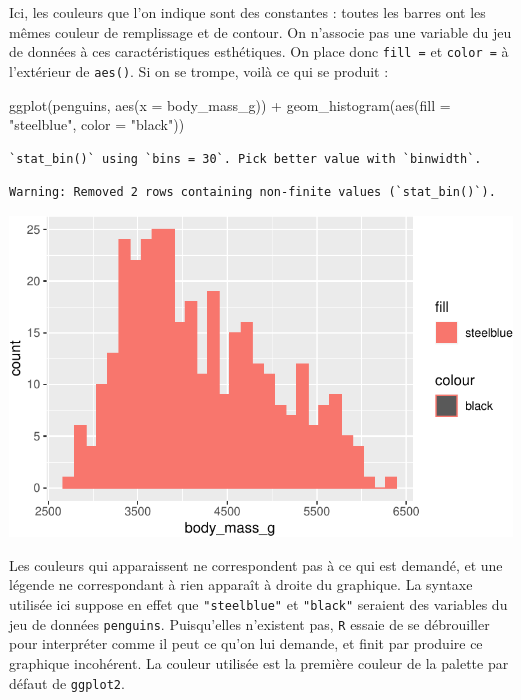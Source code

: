 \documentclass[
  a4paper,
  DIV=11,
  numbers=noendperiod,
  oneside]{scrreprt}
\newenvironment{Shaded}{}{}
\newcommand{\AttributeTok}[1]{\textcolor[rgb]{0.84,0.23,0.29}{#1}}
\newcommand{\FunctionTok}[1]{\textcolor[rgb]{0.44,0.26,0.76}{#1}}
\newcommand{\NormalTok}[1]{\textcolor[rgb]{0.14,0.16,0.18}{#1}}
\newcommand{\SpecialCharTok}[1]{\textcolor[rgb]{0.00,0.36,0.77}{#1}}
\newcommand{\StringTok}[1]{\textcolor[rgb]{0.01,0.18,0.38}{#1}}
\begin{document}
Ici, les couleurs que l'on indique sont des constantes : toutes les
barres ont les mêmes couleur de remplissage et de contour. On n'associe
pas une variable du jeu de données à ces caractéristiques esthétiques.
On place donc \texttt{fill\ =} et \texttt{color\ =} à l'extérieur de
\texttt{aes()}. Si on se trompe, voilà ce qui se produit :

\begin{Shaded}
\begin{Highlighting}[]
\FunctionTok{ggplot}\NormalTok{(penguins, }\FunctionTok{aes}\NormalTok{(}\AttributeTok{x =}\NormalTok{ body\_mass\_g)) }\SpecialCharTok{+}
  \FunctionTok{geom\_histogram}\NormalTok{(}\FunctionTok{aes}\NormalTok{(}\AttributeTok{fill =} \StringTok{"steelblue"}\NormalTok{, }\AttributeTok{color =} \StringTok{"black"}\NormalTok{))}
\end{Highlighting}
\end{Shaded}

\begin{verbatim}
`stat_bin()` using `bins = 30`. Pick better value with `binwidth`.
\end{verbatim}

\begin{verbatim}
Warning: Removed 2 rows containing non-finite values (`stat_bin()`).
\end{verbatim}

\includegraphics{03-visualization_files/figure-pdf/unnamed-chunk-11-1.pdf}

Les couleurs qui apparaissent ne correspondent pas à ce qui est demandé,
et une légende ne correspondant à rien apparaît à droite du graphique.
La syntaxe utilisée ici suppose en effet que \texttt{"steelblue"} et
\texttt{"black"} seraient des variables du jeu de données
\texttt{penguins}. Puisqu'elles n'existent pas, \texttt{R} essaie de se
débrouiller pour interpréter comme il peut ce qu'on lui demande, et
finit par produire ce graphique incohérent. La couleur utilisée est la
première couleur de la palette par défaut de \texttt{ggplot2}.
\end{document}
